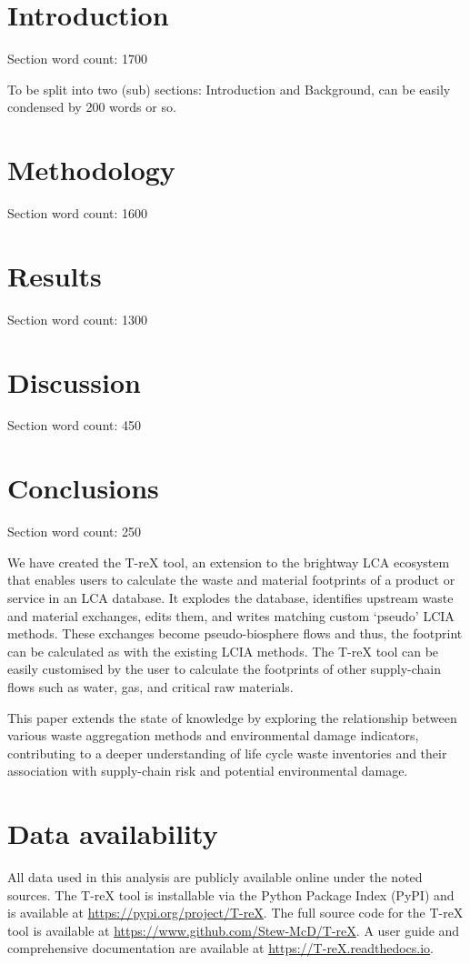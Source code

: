 \documentclass[review,3p,authoryear]{elsarticle}
\newcommand{\cbox}[1]{
    \begin{tcolorbox}[hbox, colback=red!5!white, colframe=red!65!black, boxrule=0.25pt, boxsep=2pt, left=2pt, right=2pt, top=1pt, bottom=1pt]
        \small\sffamily #1
    \end{tcolorbox}
}
\begin{document}
\section{Introduction}
\label{sec:introduction}
\cbox{Section word count: 1700}
\cbox{To be split into two (sub) sections: Introduction and Background, can be easily condensed by 200 words or so.}


\section{Methodology}
\label{sec:methodology}
\cbox{Section word count: 1600}


\section{Results}
\cbox{Section word count: 1300}
\label{sec:results}


\section{Discussion}
\label{sec:discussion}

\cbox{Section word count: 450}

\section{Conclusions}
\label{sec:conclusions}
\cbox{Section word count: 250}
We have created the T-reX tool, an extension to the brightway LCA ecosystem that enables users to calculate the waste and material footprints of a product or service in an LCA database. It explodes the database, identifies upstream waste and material exchanges, edits them, and writes matching custom `pseudo' LCIA methods. These exchanges become pseudo-biosphere flows and thus, the footprint can be calculated as with the existing LCIA methods. The T-reX tool can be easily customised by the user to calculate the footprints of other supply-chain flows such as water, gas, and critical raw materials.

This paper extends the state of knowledge by exploring the relationship between various waste aggregation methods and environmental damage indicators, contributing to a deeper understanding of life cycle waste inventories and their association with supply-chain risk and potential environmental damage.


\section*{Data availability} 
All data used in this analysis are publicly available online under the noted sources. The T-reX tool is installable via the Python Package Index (PyPI) and is available at \url{https://pypi.org/project/T-reX}.
The full source code for the T-reX tool is available at \url{https://www.github.com/Stew-McD/T-reX}.
A user guide and comprehensive documentation are available at \url{https://T-reX.readthedocs.io}.
\end{document}
